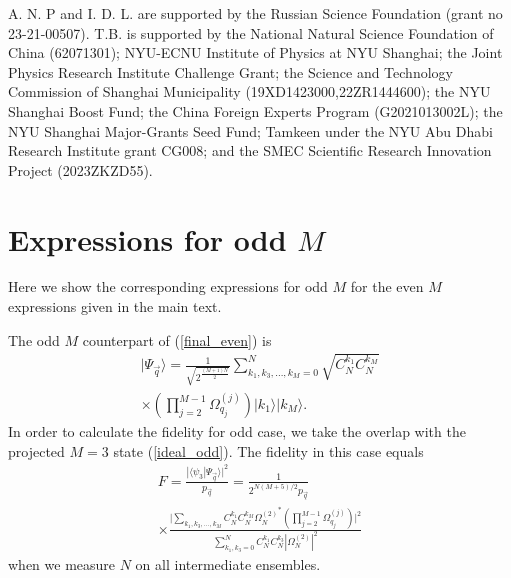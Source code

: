 \documentclass[%
  prx,%
  twocolumn,%
  preprintnumbers,%
  amsmath,%
  amssymb,%
  superscriptaddress%
]{revtex4}
\begin{document}
{A. N. P and I. D. L.  are supported by the Russian Science Foundation (grant no 23-21-00507). T.B. is supported by the National Natural Science Foundation of China (62071301); NYU-ECNU Institute of Physics at NYU Shanghai;  the Joint Physics Research Institute Challenge Grant; the Science and Technology Commission of Shanghai Municipality (19XD1423000,22ZR1444600); the NYU Shanghai Boost Fund; the China Foreign Experts Program (G2021013002L); the NYU Shanghai Major-Grants Seed Fund; Tamkeen under the NYU Abu Dhabi Research Institute grant CG008; and the SMEC Scientific Research Innovation Project (2023ZKZD55).


\appendix

\section{Expressions for odd $ M $}
\label{sec:oddMexpressions}

Here we show the corresponding expressions for odd $ M $ for the even $ M $ expressions given in the main text.

The odd $ M $ counterpart of (\ref{final_even}) is
%
\begin{multline}
\label{final_odd}
| \Psi_{\vec{q}} \rangle=\frac{1}{\sqrt{2^{\frac{(M+1)N}{2}}}}\sum_{k_1,k_3,\ldots,k_M=0}^{N} \sqrt{ C^{k_1}_{N}  C^{k_M}_{N} }
 \\ \times \left( \prod_{j=2}^{M-1} \Omega_{q_j}^{(j)} \right) |k_1\rangle|k_M\rangle .
\end{multline}
%
In order to calculate the fidelity for odd case, we take the overlap with the projected $ M = 3 $ state (\ref{ideal_odd}). The fidelity in this case equals
%
\begin{multline}
\label{fidelity_odd}
F = \frac{| \langle  \psi_3 | \Psi_{\vec{q}} \rangle |^2}{p_{\vec{q}} }   =\frac{1}{2^{N(M+5)/2} p_{\vec{q}} }\\
\times \frac{\Big|\sum_{k_1, k_3, \dots, k_M }
 C_N^{k_1}C_N^{k_M} {\Omega_{N}^{(2)}}^* \left( \prod_{j=2}^{M-1} \Omega_{q_j}^{(j)} \right)   \Big|^2 }{ \sum_{k_1,k_3=0}^{N}  C^{k_1}_{N}  C^{k_3}_{N} | \Omega_{N}^{(2)} |^2 }
\end{multline}
%
when we measure $N$ on all  intermediate ensembles.



}
\end{document}
